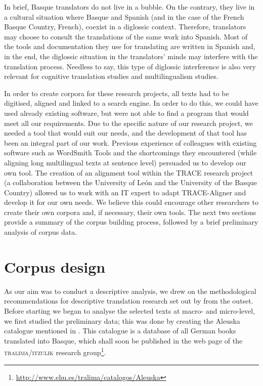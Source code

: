 \documentclass[output=paper]{LSP/langsci}
\begin{document}
In brief, Basque translators do not live in a bubble. On the contrary, they live in a cultural situation where Basque and Spanish (and in the case of the French Basque Country, French), coexist in a diglossic context. Therefore, translators may choose to consult the translations of the same work into Spanish. Most of the tools and documentation they use for translating are written in Spanish and, in the end, the diglossic situation in the translators’ minds may interfere with the translation process. Needless to say, this type of diglossic interference is also very relevant for cognitive translation studies and multilingualism studies.

In order to create corpora for these research projects, all texts had to be digitised, aligned and linked to a search engine. In order to do this, we could have used already existing software, but were not able to find a program that would meet all our requirements. Due to the specific nature of our research project, we needed a tool that would suit our needs, and the development of that tool has been an integral part of our work. Previous experience of colleagues with existing software such as WordSmith Tools and the shortcomings they encountered (while aligning long multilingual texts at sentence level) persuaded us to develop our own tool. The creation of an alignment tool within the TRACE research project (a collaboration between the University of León and the University of the Basque Country) allowed us to work with an IT expert to adapt TRACE-Aligner and develop it for our own needs. We believe this could encourage other researchers to create their own corpora and, if necessary, their own tools. The next two sections provide a summary of the corpus building process, followed by a brief preliminary analysis of corpus data.

\section{Corpus design}

As our aim was to conduct a descriptive analysis, we drew on the methodological recommendations for descriptive translation research set out by \citet{Lambert1985} from the outset. Before starting we began to analyse the selected texts at macro- and micro-level, we first studied the preliminary data; this was done by creating the Aleuska catalogue mentioned in . This catalogue is a database of all German books translated into Basque, which shall soon be published in the web page of the \textsc{tralima}/\textsc{itzulik} research group\footnote{\url{http://www.ehu.es/tralima/catalogos/Aleuska}}.
\end{document}
